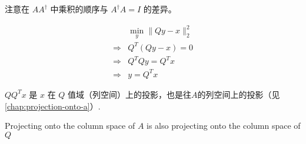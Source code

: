 \begin{remark}
    注意在 $A A^{\dagger}$ 中乘积的顺序与 $A^{\dagger} A=I$ 的差异。
\end{remark}

$$
\begin{aligned}
&\min _{y}\|Q y-x\|_{2}^{2}\\
 \Rightarrow& Q^{T}(Q y-x)=0 \\
\Rightarrow& Q^{T} Q y=Q^{T} x\\ 
\Rightarrow & y=Q^{T} x
\end{aligned}
$$

$Q Q^{T} x$ 是 $x$ 在 $Q$ 值域（列空间）上的投影，也是往$A$的列空间上的投影（见\ref{chap:projection-onto-a}）. 

\begin{FigureCenter}{Projecting onto the column space of $A$ is also projecting onto the column space of $Q$}
    
\end{FigureCenter}


